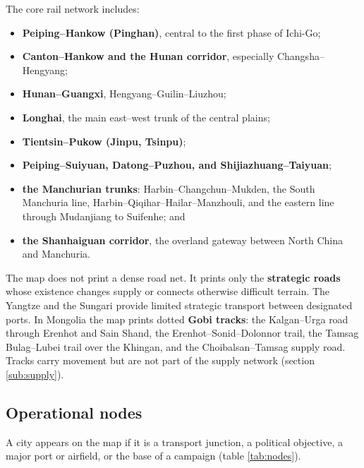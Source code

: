 \documentclass[11pt]{article}
\begin{document}
The core rail network includes:
\begin{itemize}
\item \textbf{Peiping--Hankow (Pinghan)}, central to the first phase of Ichi-Go;
\item \textbf{Canton--Hankow and the Hunan corridor}, especially Changsha--Hengyang;
\item \textbf{Hunan--Guangxi}, Hengyang--Guilin--Liuzhou;
\item \textbf{Longhai}, the main east--west trunk of the central plains;
\item \textbf{Tientsin--Pukow (Jinpu, Tsinpu)};
\item \textbf{Peiping--Suiyuan, Datong--Puzhou, and Shijiazhuang--Taiyuan};
\item \textbf{the Manchurian trunks}: Harbin--Changchun--Mukden, the South Manchuria line, Harbin--Qiqihar--Hailar--Manzhouli, and the eastern line through Mudanjiang to Suifenhe; and
\item \textbf{the Shanhaiguan corridor}, the overland gateway between North China and Manchuria.
\end{itemize}

The map does not print a dense road net. It prints only the \textbf{strategic roads} whose existence changes supply or connects otherwise difficult terrain. The Yangtze and the Sungari provide limited strategic transport between designated ports. In Mongolia the map prints dotted \textbf{Gobi tracks}: the Kalgan--Urga road through Erenhot and Sain Shand, the Erenhot--Sonid--Dolonnor trail, the Tamsag Bulag--Lubei trail over the Khingan, and the Choibalsan--Tamsag supply road. Tracks carry movement but are not part of the supply network (section \ref{sub:supply}).

\subsection{Operational nodes}
A city appears on the map if it is a transport junction, a political objective, a major port or airfield, or the base of a campaign (table \ref{tab:nodes}).
\end{document}
